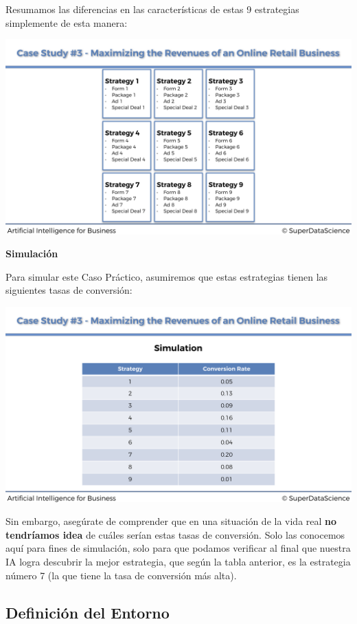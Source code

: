 \documentclass[]{book}
\begin{document}
Resumamos las diferencias en las características de estas 9 estrategias simplemente de esta manera:

\includegraphics{Images/Strategies_Slide.png}

\textbf{Simulación}

Para simular este Caso Práctico, asumiremos que estas estrategias tienen las siguientes tasas de conversión:

\includegraphics{Images/Simulation_Slide.png}

Sin embargo, asegúrate de comprender que en una situación de la vida real \textbf{no tendríamos idea} de cuáles serían estas tasas de conversión. Solo las conocemos aquí para fines de simulación, solo para que podamos verificar al final que nuestra IA logra descubrir la mejor estrategia, que según la tabla anterior, es la estrategia número 7 (la que tiene la tasa de conversión más alta).

\hypertarget{definiciuxf3n-del-entorno}{%
\subsection{Definición del Entorno}\label{definiciuxf3n-del-entorno}}
\end{document}
